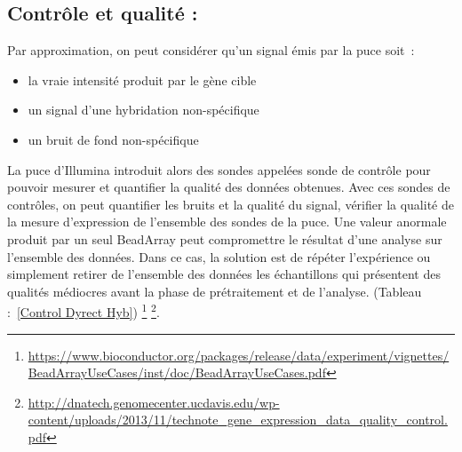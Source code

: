 \documentclass[a4paper,10pt]{article}
\begin{document}
\subsection{ Contrôle et qualité :}
Par approximation, on peut considérer qu’un signal émis par la puce soit :
\begin{itemize}
 \item la vraie intensité produit par le gène cible
 \item un signal d’une hybridation non-spécifique
 \item un bruit de fond non-spécifique
\end{itemize}
La puce d’Illumina introduit alors des sondes appelées sonde de contrôle pour pouvoir mesurer et quantifier la qualité des données obtenues.
Avec ces sondes de contrôles, on peut quantifier les bruits et la qualité du signal, vérifier la qualité de la mesure d’expression de l'ensemble des sondes de la puce. 
Une valeur anormale produit par un seul BeadArray peut compromettre le résultat d’une analyse sur l’ensemble des données. 
Dans ce cas, la solution est de répéter l’expérience ou simplement retirer de l’ensemble des données les échantillons qui présentent des qualités médiocres avant la phase de prétraitement et de l’analyse. (Tableau :~\ref{Control Dyrect  Hyb})
\footnote{\url{https://www.bioconductor.org/packages/release/data/experiment/vignettes/BeadArrayUseCases/inst/doc/BeadArrayUseCases.pdf}}
\footnote{\url{http://dnatech.genomecenter.ucdavis.edu/wp-content/uploads/2013/11/technote\_gene\_expression\_data\_quality\_control.pdf}}.
\end{document}
